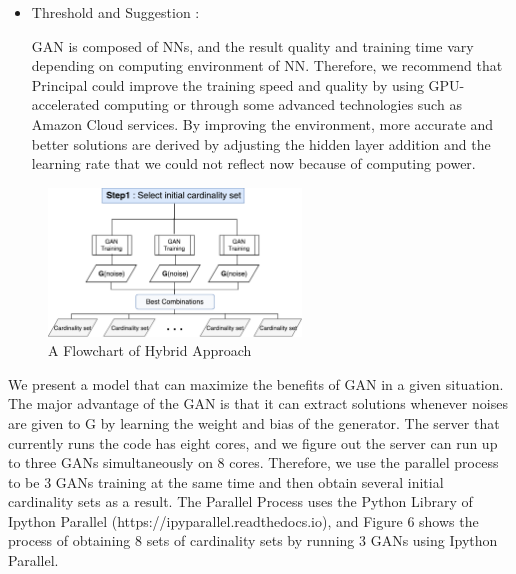 \documentclass[11pt]{article}
\begin{document}
\begin{itemize}
\begin{itemize}
	 \item Threshold and Suggestion :
	 
	 GAN is composed of NNs, and the result quality and training time vary depending on computing environment of NN. Therefore, we recommend that Principal could improve the training speed and quality by using GPU-accelerated computing or through some advanced technologies such as Amazon Cloud services. By improving the environment, more accurate and better solutions are derived by adjusting the hidden layer addition and the learning rate that we could not reflect now because of computing power. 
 
 	 \end{itemize}
 
 
 
\begin{figure}[h] 
	\begin{center}
		\includegraphics[width=0.6\textwidth]{step1}
		\caption{A Flowchart of Hybrid Approach} \label{fig:step1}
	\end{center}
\end{figure}


	We present a model that can maximize the benefits of GAN in a given situation. The major advantage of the GAN is that it can extract solutions whenever noises are given to G by learning the weight and bias of the generator.
	The server that currently runs the code has eight cores, and we figure out the server can run up to three GANs simultaneously on 8 cores. Therefore, we use the parallel process to be 3 GANs training at the same time and then obtain several initial cardinality sets as a result. The Parallel Process uses the Python Library of Ipython Parallel (https://ipyparallel.readthedocs.io), and Figure 6 shows the process of obtaining 8 sets of cardinality sets by running 3 GANs using Ipython Parallel.
	

\end{itemize}
\end{document}
